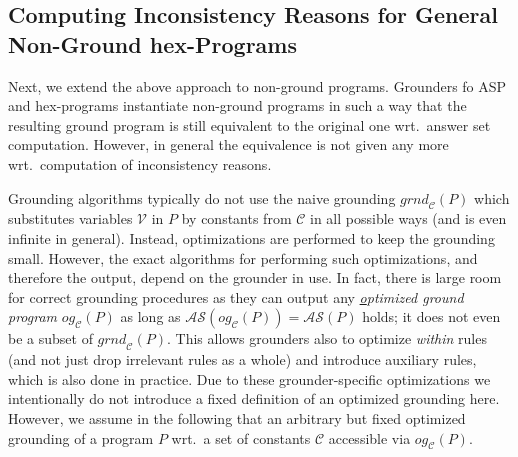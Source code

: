 \documentclass[11pt,fleqn,twoside]{article}
\newcommand\hex{{\sc hex}\xspace}
\newcommand{\Program}{\ensuremath{P}}
\begin{document}
		\subsection{Computing Inconsistency Reasons for General Non-Ground \hex-Programs}
		\label{sec:computing:nonground:incompleteprocedural}

			Next, we extend the above approach to non-ground programs.
			Grounders fo ASP and \hex{}-programs instantiate non-ground programs in such a way
			that the resulting ground program is still equivalent to the original one wrt.~answer set computation.
			However, in general the equivalence is not given any more wrt.~computation of inconsistency reasons.
		
			Grounding algorithms typically do not
			use the naive grounding $\mathit{grnd}_{\mathcal{C}}(\Program)$ which
			substitutes variables $\mathcal{V}$ in $\Program$ by constants from $\mathcal{C}$ in all possible ways (and is even infinite in general).
			Instead, optimizations are performed to keep the grounding small.
			However, the exact algorithms for performing such optimizations, and therefore the output, depend on the grounder in use.
			In fact, there is large room for correct grounding procedures as they can output
			any \emph{\underline{o}ptimized \underline{g}round program} $\mathit{og}_{\mathcal{C}}(\Program)$
			as long as $\mathcal{AS}(\mathit{og}_{\mathcal{C}}(\Program)) = \mathcal{AS}(\Program)$ holds;
			it does not even be a subset of $\mathit{grnd}_{\mathcal{C}}(\Program)$.
			This allows grounders also to optimize \emph{within} rules (and not just drop irrelevant rules as a whole) and introduce auxiliary rules,
			which is also done in practice.
			Due to these grounder-specific optimizations we intentionally do not introduce a fixed definition of an optimized grounding here.
			However, we assume in the following
			that an arbitrary but fixed optimized grounding of a program $\Program$ wrt.~a set of constants $\mathcal{C}$
			accessible via $\mathit{og}_{\mathcal{C}}(\Program)$.
\end{document}
